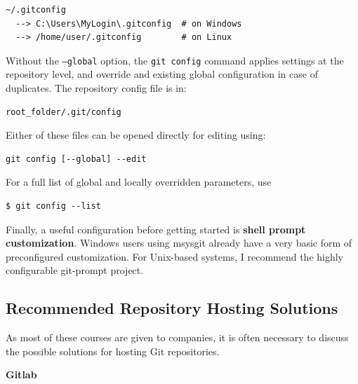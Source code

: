 \documentclass{../common/tufte-latex/tufte-handout}
\begin{document}
\begin{lstlisting}[style=BashInputStyle]
  ~/.gitconfig
  --> C:\Users\MyLogin\.gitconfig  # on Windows
  --> /home/user/.gitconfig        # on Linux
\end{lstlisting}

Without the \texttt{--global} option, the \texttt{git config} command applies settings at the repository level, and override and existing global configuration in case of duplicates. The repository config file is in:

\begin{lstlisting}[style=BashInputStyle]
  root_folder/.git/config
\end{lstlisting}

\noindent Either of these files can be opened directly for editing using: 

\begin{lstlisting}[style=BashInputStyle]
  git config [--global] --edit
\end{lstlisting}

\noindent For a full list of global and locally overridden parameters, use

\begin{lstlisting}[style=BashInputStyle]
  $ git config --list
\end{lstlisting}

Finally, a useful configuration before getting started is \textbf{shell prompt customization}.
Windows users using msysgit already have a very basic form of preconfigured customization. 
For Unix-based systems, I recommend the highly configurable git-prompt project. 


\subsection{Recommended Repository Hosting Solutions}

As most of these courses are given to companies, it is often necessary to discuss the possible solutions for hosting Git repositories.

\textbf{Gitlab}
\end{document}
